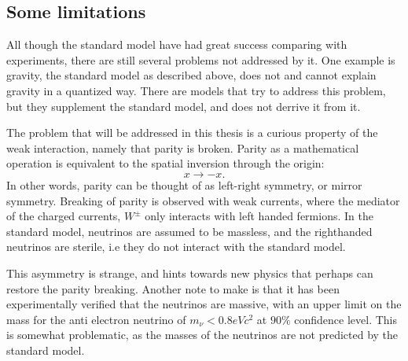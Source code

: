 \subsection*{Some limitations}
All though the standard model have had great success comparing with experiments,
there are still several problems not addressed by it. One example is gravity, the standard model
as described above, does not and cannot explain gravity in a quantized way. There 
are models that try to address this problem, but they supplement the standard model,
and does not derrive it from it. \par 
The problem that will be addressed in this thesis is a curious property of the weak interaction, 
namely that parity is broken. Parity as a mathematical operation is equivalent to the spatial inversion 
through the origin\cite{Thomson:2013zua}:
\begin{equation}
    x \to -x.
\end{equation}
In other words, parity can be thought of as left-right symmetry, or mirror symmetry. Breaking of parity is observed
with weak currents, where the mediator of the charged currents, $W^{\pm}$ only interacts with 
left handed fermions. In the standard model, neutrinos are assumed to be massless, and the righthanded 
neutrinos are sterile, i.e they do not interact with the standard model. \par 
This asymmetry is strange, and hints towards new physics that perhaps can restore the parity breaking. 
Another note to make is that it has been experimentally verified that the neutrinos are massive\cite{Katrin_neutrinos},
with an upper limit on the mass for the anti electron neutrino of $m_{\nu} < 0.8eVc^2$ at $90\%$ confidence level.
This is somewhat problematic, as the masses of the neutrinos are not predicted by the standard model. 








